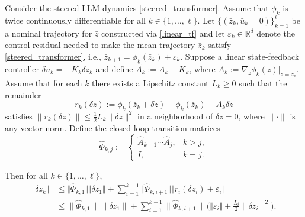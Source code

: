 \documentclass[10pt,a4paper]{amsart}
\begin{document}
\begin{theorem}\label{ap:thm:tracking}
Consider the steered LLM dynamics \eqref{steered_transformer}. Assume that $\phi_k$ is twice continuously differentiable for all $k \in \{1,\ldots,\ell\}$. Let $\{(\bar z_k,\bar u_k=0)\}_{k=1}^\ell$ be a nominal trajectory for $\bar z$ constructed via \eqref{linear_tf} and let $\varepsilon_k \in \mathbb{R}^d$ denote the control residual needed to make the mean trajectory $\bar z_k$ satisfy \eqref{steered_transformer}, i.e., $\bar z_{k+1} = \phi_k(\bar z_k) + \varepsilon_k$.
Suppose a linear state-feedback controller $\delta u_k = -K_k \delta z_k$ and define
$\hat A_k := A_k - K_k$, where $A_k := \nabla_z \phi_k(z)|_{z=\bar z_k}$. Assume that for each $k$ there exists a Lipschitz constant $L_k \ge 0$ such that the remainder
\begin{equation}
    r_k(\delta z) := \phi_k(\bar z_k+\delta z) - \phi_k(\bar z_k) - A_k \delta z
\end{equation}
satisfies
$\|r_k(\delta z)\| \le \frac{1}{2} L_k \|\delta z\|^2$ in a neighborhood of $\delta z = 0$, where $\|\cdot\|$ is any vector norm.
Define the closed-loop transition matrices 
\begin{equation}\label{eq:app_transition_matrices}
    \hat\Phi_{k,j} :=
    \begin{cases}
    \hat A_{k-1} \cdots \hat A_j, & k>j, \\
    I, & k=j.
    \end{cases}
\end{equation}

Then for all $k \in \{1,\ldots, \ell\}$,
\begin{subequations}
    \begin{align}
        \Vert \delta z_k\Vert  &\le  \Vert \hat\Phi_{k,1} \Vert \Vert \delta z_1\Vert  + \sum_{i=1}^{k-1} \Vert \hat\Phi_{k,i+1}\Vert \Vert r_i(\delta z_i)+\varepsilon_i\Vert \\
        &\le \|\hat\Phi_{k,1}\|\,\|\delta z_1\| + \sum_{i=1}^{k-1} \|\hat\Phi_{k,i+1}\|\, \Big(\Vert \varepsilon_i\Vert + \frac{L_i}{2}\|\delta z_i\|^2 \Big).
    \end{align}
\end{subequations}
\end{theorem}
\end{document}
